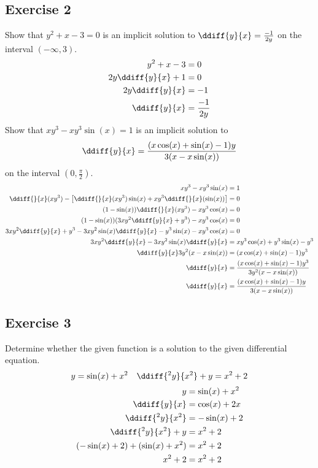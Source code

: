 \documentclass{math}
\begin{document}
\subsection*{Exercise 2}
Show that \( y^2+x-3 = 0 \) is an implicit solution to \( \ddiff{y}{x} =
\frac{-1}{2y} \) on the interval \( (-\infty,3) \).
\begin{align*}
  y^2+x-3 &= 0 \\
  2y\ddiff{y}{x}+1 &= 0 \\
  2y\ddiff{y}{x} &= -1 \\
  \ddiff{y}{x} &= \frac{-1}{2y}
\end{align*}
Show that \( xy^3-xy^3\sin(x) = 1 \) is an implicit solution to
\[ \ddiff{y}{x} = \frac{(x\cos(x)+\sin(x)-1)y}{3(x-x\sin(x))} \]
on the interval \( (0,\frac{\pi}{2}) \).
\begin{align*}
  xy^3-xy^3\sin(x) &= 1 \\
  \ddiff{}{x}(xy^3)-
    \left[\ddiff{}{x}(xy^3)\sin(x)+xy^3\ddiff{}{x}(\sin(x))\right] &= 0 \\
  (1-\sin(x))\ddiff{}{x}(xy^3)-xy^3\cos(x) &= 0 \\
  (1-\sin(x))(3xy^2\ddiff{y}{x}+y^3)-xy^3\cos(x) &= 0 \\
  3xy^2\ddiff{y}{x}+y^3-3xy^2\sin(x)\ddiff{y}{x}-y^3\sin(x)-xy^3\cos(x) &= 0 \\
  3xy^2\ddiff{y}{x}-3xy^2\sin(x)\ddiff{y}{x} &= xy^3\cos(x)+y^3\sin(x)-y^3 \\
  \ddiff{y}{x}3y^2(x-x\sin(x)) &= (x\cos(x)+\sin(x)-1)y^3 \\
  \ddiff{y}{x} &= \frac{(x\cos(x)+\sin(x)-1)y^3}{3y^2(x-x\sin(x))} \\
  \ddiff{y}{x} &= \frac{(x\cos(x)+\sin(x)-1)y}{3(x-x\sin(x))} \\
\end{align*}

\subsection*{Exercise 3}
Determine whether the given function is a solution to the given differential
equation.
\[ y = \sin(x)+x^2 \quad \ddiff{^2y}{x^2}+y = x^2+2 \]
\begin{align*}
  y &= \sin(x)+x^2 \\
  \ddiff{y}{x} &= \cos(x)+2x \\
  \ddiff{^2y}{x^2} &= -\sin(x)+2 \\
  \ddiff{^2y}{x^2}+y &= x^2+2 \\
  (-\sin(x)+2)+(\sin(x)+x^2) &= x^2+2 \\
  x^2+2 &= x^2+2
\end{align*}
\end{document}
